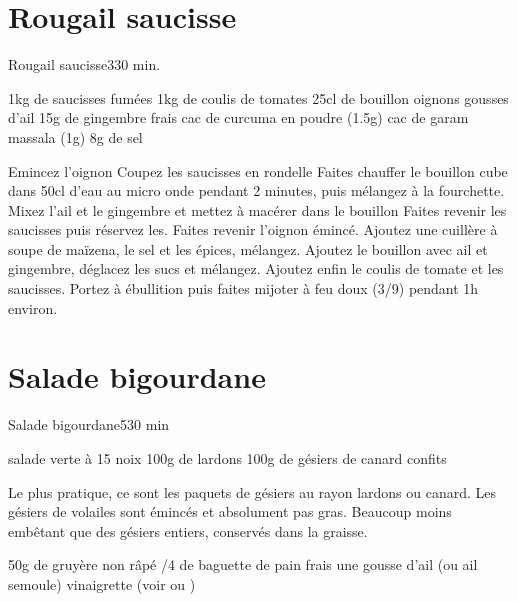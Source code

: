 {\section{Rougail saucisse}
\begin{recette}{Rougail saucisse}{3}{30 min.}{}
\begin{ingredients}
\ingredient 1kg de saucisses fumées
\ingredient 1kg de coulis de tomates
\ingredient 25cl de bouillon
 oignons
 gousses d'ail
\ingredient 15g de gingembre frais %
 cac de curcuma en poudre (1.5g)
 cac de garam massala (1g)
\ingredient 8g de sel
\end{ingredients}


\begin{preparation}
\etape Emincez l'oignon
\etape Coupez les saucisses en rondelle
\etape Faites chauffer le bouillon cube dans 50cl d'eau au micro onde pendant 2 minutes, puis mélangez à la fourchette. 
\etape Mixez l'ail et le gingembre et mettez à macérer dans le bouillon
\etape Faites revenir les saucisses puis réservez les.
\etape Faites revenir l'oignon émincé. Ajoutez une cuillère à soupe de maïzena, le sel et les épices, mélangez.
\etape Ajoutez le bouillon avec ail et gingembre, déglacez les sucs et mélangez. 
\etape Ajoutez enfin le coulis de tomate et les saucisses.
\etape Portez à ébullition puis faites mijoter à feu doux (3/9) pendant 1h environ. 
\end{preparation}
\end{recette}


\section{Salade bigourdane}
\begin{recette}{Salade bigourdane}{5}{30 min}{}
\begin{ingredients}
\ingredient salade verte
 à 15 noix
\ingredient 100g de lardons
\ingredient 100g de gésiers de canard confits
\begin{remarque}
Le plus pratique, ce sont les paquets de gésiers au rayon lardons ou canard. Les gésiers de volailes sont émincés et absolument 
pas gras. Beaucoup moins embêtant que des gésiers entiers, conservés dans la graisse.
\end{remarque}
\ingredient 50g de gruyère non râpé
/4 de baguette de pain frais
\ingredient une gousse d'ail (ou ail semoule)
\ingredient vinaigrette (voir  ou )


\end{ingredients}
\end{recette}}
